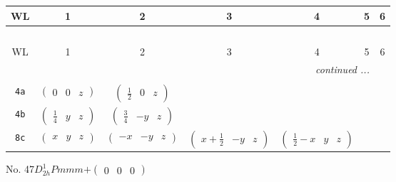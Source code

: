 \documentclass[fleqn,9pt,landscape]{jsarticle}
\begin{document}
\begin{center}
\renewcommand{\arraystretch}{1.2}
\begin{longtable}{ccccccc}
 \hline \hline
WL & 1 & 2 & 3 & 4 & 5 & 6 \\ \hline \endfirsthead

\multicolumn{6}{l}{\tablename\ \thetable{}} \\
 \hline \hline
WL & 1 & 2 & 3 & 4 & 5 & 6 \\ \hline \endhead

 \hline \hline
\multicolumn{6}{r}{\footnotesize\it continued ...} \\ \endfoot

 \hline \hline
\multicolumn{6}{r}{} \\ \endlastfoot

{\tt 4a} & $ \begin{pmatrix} 0 & 0 & z \end{pmatrix} $ & $ \begin{pmatrix} \frac{1}{2} & 0 & z \end{pmatrix} $ & $  $ & $  $ \\ \hline
{\tt 4b} & $ \begin{pmatrix} \frac{1}{4} & y & z \end{pmatrix} $ & $ \begin{pmatrix} \frac{3}{4} & - y & z \end{pmatrix} $ & $  $ & $  $ \\ \hline
{\tt 8c} & $ \begin{pmatrix} x & y & z \end{pmatrix} $ & $ \begin{pmatrix} - x & - y & z \end{pmatrix} $ & $ \begin{pmatrix} x + \frac{1}{2} & - y & z \end{pmatrix} $ & $ \begin{pmatrix} \frac{1}{2} - x & y & z \end{pmatrix} $ \\
\end{longtable}
\end{center}
\newpage
No. 47\quad$D_{2h}^{1}$\quad$Pmmm$\quad[ orthorhombic ]\quad$+\begin{pmatrix} 0 & 0 & 0 \end{pmatrix}$
\end{document}
